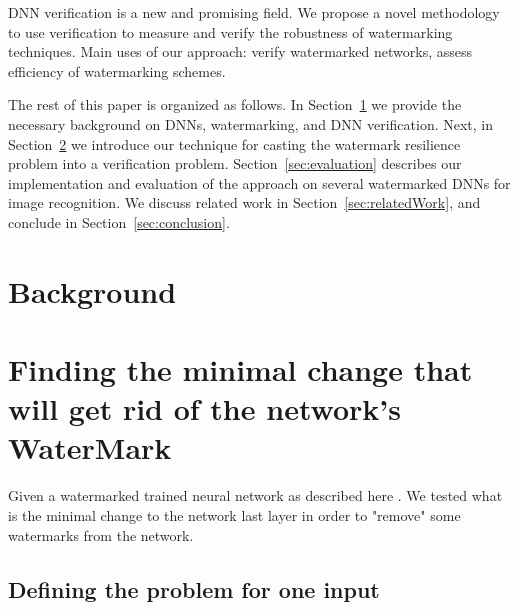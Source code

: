 \documentclass[a4paper]{llncs}
\newcommand{\guy}[1]{\marginpar{\textcolor{orange}{Guy: #1}}}
\begin{document}
DNN verification is a new and promising field. We propose a novel
methodology to use verification to measure and verify the robustness
of watermarking techniques.
Main uses of our approach: verify watermarked networks, assess
efficiency of watermarking schemes.

The rest of this paper is organized as follows. In
Section~\ref{sec:background} we provide the necessary background on
DNNs, watermarking, and DNN verification. Next, in
Section~\ref{sec:verifyWatermarks} we introduce our technique for
casting the watermark resilience problem into a verification
problem. Section~\ref{sec:evaluation} describes our implementation and evaluation of the approach on several watermarked DNNs for image
recognition. We discuss related work in Section~\ref{sec:relatedWork},
and conclude in Section~\ref{sec:conclusion}.

\section{Background}
\label{sec:background}

\cite{KaBaDiJuKo17Reluplex,KaHuIbJuLaLiShThWuZeDiKoBa19Marabou}

\section{Finding the minimal change that will get rid of the network's WaterMark}
\label{sec:verifyWatermarks}

Given a watermarked trained neural network as described
here \cite{AdBaPiKeWatermarking}.
\guy{make this a proper citation}
We
tested what is the minimal change to the network last layer in order
to "remove" some watermarks from the network.


\subsection{Defining the problem for one input}
\label{sec:defineProblem1}
\end{document}
